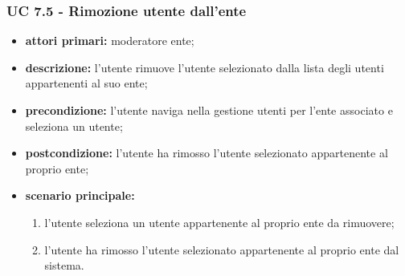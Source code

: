			\subsubsection{UC 7.5 - Rimozione utente dall'ente}
			\begin{itemize}
				\item \textbf{attori primari:} moderatore ente;
				\item \textbf{descrizione:} l'utente rimuove l'utente selezionato dalla lista degli utenti appartenenti al suo ente;
				\item \textbf{precondizione:} l'utente naviga nella gestione utenti per l'ente associato e seleziona un utente;
				\item \textbf{postcondizione:} l'utente ha rimosso l'utente selezionato appartenente al proprio ente;
				\item \textbf{scenario principale:}
				\begin{enumerate}
					\item{l'utente seleziona un utente appartenente al proprio ente da rimuovere;}
					\item{l'utente ha rimosso l'utente selezionato appartenente al proprio ente dal sistema.}
				\end{enumerate}
			\end{itemize}
